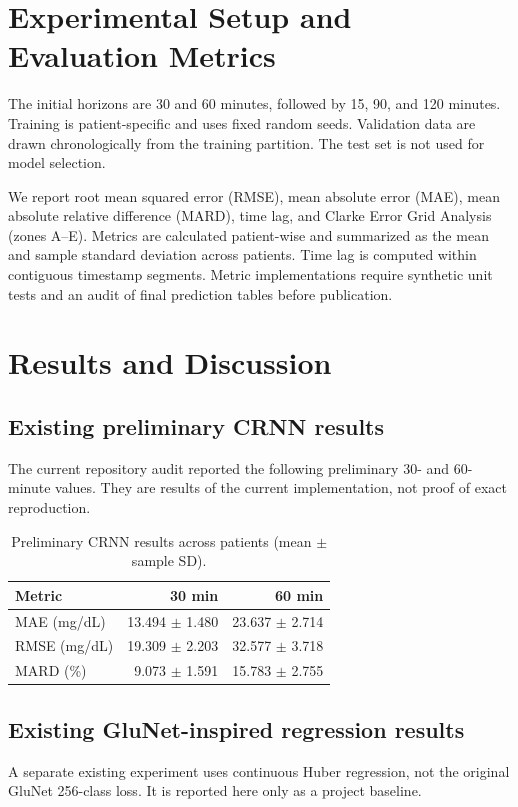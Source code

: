 \documentclass[conference]{IEEEtran}
\begin{document}
\section{Experimental Setup and Evaluation Metrics}
The initial horizons are 30 and 60 minutes, followed by 15, 90, and 120 minutes. Training is patient-specific and uses fixed random seeds. Validation data are drawn chronologically from the training partition. The test set is not used for model selection.

We report root mean squared error (RMSE), mean absolute error (MAE), mean absolute relative difference (MARD), time lag, and Clarke Error Grid Analysis (zones A--E). Metrics are calculated patient-wise and summarized as the mean and sample standard deviation across patients. Time lag is computed within contiguous timestamp segments. Metric implementations require synthetic unit tests and an audit of final prediction tables before publication.

\section{Results and Discussion}
\subsection{Existing preliminary CRNN results}
The current repository audit reported the following preliminary 30- and 60-minute values. They are results of the current implementation, not proof of exact reproduction.

\begin{table}[t]
\centering
\caption{Preliminary CRNN results across patients (mean $\pm$ sample SD).}
\label{tab:crnn-preliminary}
\begin{tabular}{lrr}
\toprule
Metric & 30 min & 60 min \\
\midrule
MAE (mg/dL) & 13.494 $\pm$ 1.480 & 23.637 $\pm$ 2.714 \\
RMSE (mg/dL) & 19.309 $\pm$ 2.203 & 32.577 $\pm$ 3.718 \\
MARD (\%) & 9.073 $\pm$ 1.591 & 15.783 $\pm$ 2.755 \\
\bottomrule
\end{tabular}
\end{table}

\subsection{Existing GluNet-inspired regression results}
A separate existing experiment uses continuous Huber regression, not the original GluNet 256-class loss. It is reported here only as a project baseline.
\end{document}
